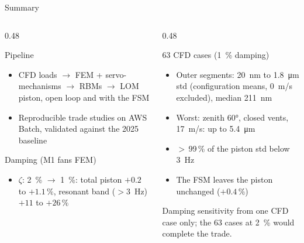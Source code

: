 \documentclass[10pt,aspectratio=169]{beamer}
\begin{document}
\begin{frame}{Summary}
  \begin{columns}[T]
    \begin{column}{0.48\textwidth}
      \begin{block}{Pipeline}
        \begin{itemize}
          \item CFD loads $\rightarrow$ FEM + servo-mechanisms $\rightarrow$ RBMs $\rightarrow$ LOM piston, open loop and with the FSM
          \item Reproducible trade studies on AWS Batch, validated against the 2025 baseline
        \end{itemize}
      \end{block}
      \begin{block}{Damping (M1 fans FEM)}
        \begin{itemize}
          \item $\zeta$: \SI{2}{\%} $\rightarrow$ \SI{1}{\%}: total piston $+0.2$ to $+1.1\,\%$, resonant band ($>$\SI{3}{Hz}) $+11$ to $+26\,\%$
        \end{itemize}
      \end{block}
    \end{column}
    \begin{column}{0.48\textwidth}
      \begin{block}{63 CFD cases (\SI{1}{\%} damping)}
        \begin{itemize}
          \item Outer segments: \SI{20}{nm} to \SI{1.8}{\micro m} std (configuration means, \SI{0}{m/s} excluded), median \SI{211}{nm}
          \item Worst: zenith \ang{60}, closed vents, \SI{17}{m/s}: up to \SI{5.4}{\micro m}
          \item $>$\,99\,\% of the piston std below \SI{3}{Hz}
          \item The FSM leaves the piston unchanged ($+0.4\,\%$)
        \end{itemize}
      \end{block}
      {\small Damping sensitivity from one CFD case only; the 63 cases at \SI{2}{\%} would complete the trade.}
    \end{column}
  \end{columns}
\end{frame}
\end{document}
